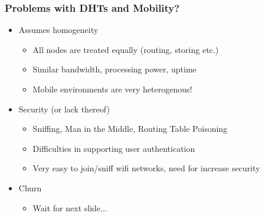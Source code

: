 \documentclass{beamer}
\begin{document}
\begin{frame}
  \frametitle{Problems with DHTs and Mobility?}
    \begin{itemize}
    \item
        Assumes homogeneity\\
        \begin{itemize}
            \item All nodes are treated equally (routing, storing
            etc.)
            \item Similar bandwidth, processing power, uptime
            \item \alert{Mobile environments are very heterogenous!}
        \end{itemize}
    \item
        Security (or lack thereof)\\
        \begin{itemize}
            \item Sniffing, Man in the Middle, Routing Table Poisoning
            \item Difficulties in supporting user authentication
            \item \alert{Very easy to join/sniff wifi networks, need for increase
            security}
        \end{itemize}
    \item
        Churn
        \begin{itemize}
            \item Wait for next slide...
        \end{itemize}
    \end{itemize}
\end{frame}
\end{document}
